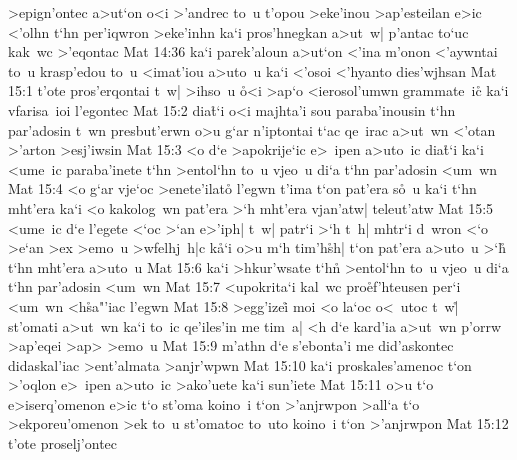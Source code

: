 >epign'ontec
a>ut`on
o<i
>'andrec
to~u
t'opou
>eke'inou
>ap'esteilan
e>ic
<'olhn
t`hn
per'iqwron
>eke'inhn
ka`i
pros'hnegkan
a>ut~w|
p'antac
to`uc
kak~wc
>'eqontac\bibvsend
\vs Mat 14:36
ka`i
parek'aloun
a>ut`on
<'ina
m'onon
<'aywntai
to~u
krasp'edou
to~u
<imat'iou
a>uto~u
ka`i
<'osoi
<'hyanto
dies'wjhsan\bibvsend
\vs Mat 15:1
t'ote
pros'erqontai
t~w|
>ihso~u
\r{o}<i
>ap`o
<ierosol'umwn
grammate~ic\r{}
ka`i
vfarisa~ioi
l'egontec\bibvsend
\vs Mat 15:2
dia\r{t}`i
o<i
majhta'i
sou
paraba'inousin
t`hn
par'adosin
t~wn
presbut'erwn
o>u
g`ar
n'iptontai
t`ac
qe~irac
a>ut~wn
<'otan
>'arton
>esj'iwsin\bibvsend
\vs Mat 15:3
<o
d`e
>apokrije`ic
e>~ipen
a>uto~ic
dia\r{t}`i
ka`i
<ume~ic
paraba'inete
t`hn
>entol`hn
to~u
vjeo~u
di`a
t`hn
par'adosin
<um~wn\bibvsend
\vs Mat 15:4
<o
g`ar
vje`oc
>enete'ilato\r{}
l'egwn
t'ima
t`on
pat'era
s\r{o}~u
ka`i
t`hn
mht'era
ka`i
<o
kakolog~wn
pat'era
>`h
mht'era
vjan'atw|
teleut'atw\bibvsend
\vs Mat 15:5
<ume~ic
d`e
l'egete
<`oc
>`an
e>'iph|
t~w|
patr`i
>`h
t~h|
mhtr`i
d~wron
<`o
>e`an
>ex
>emo~u
>wfelhj~h|c
k\r{a}`i
o>u
m`h
tim'h\r{s}h|
t`on
pat'era
a>uto~u
>`h\r{}
t`hn
mht'era
a>uto~u\bibvsend
\vs Mat 15:6
ka`i
>hkur'wsate
t`hn\r{}
>entol`hn
to~u
vjeo~u
di`a
t`hn
par'adosin
<um~wn\bibvsend
\vs Mat 15:7
<upokrita`i
kal~wc
pro\r{e}f'hteusen
per`i
<um~wn
<h\r{s}a"'iac
l'egwn\bibvsend
\vs Mat 15:8
>egg'izei\r{}
moi
<o
la`oc
o<~utoc
t~w|\r{}
st'omati
a>ut~wn
ka`i
to~ic
qe'iles'in
me
tim~a|
<h
d`e
kard'ia
a>ut~wn
p'orrw
>ap'eqei
>ap>
>emo~u\bibvsend
\vs Mat 15:9
m'athn
d`e
s'ebonta'i
me
did'askontec
didaskal'iac
>ent'almata
>anjr'wpwn\bibvsend
\vs Mat 15:10
ka`i
proskales'amenoc
t`on
>'oqlon
e>~ipen
a>uto~ic
>ako'uete
ka`i
sun'iete\bibvsend
\vs Mat 15:11
o>u
t`o
e>iserq'omenon
e>ic
t`o
st'oma
koino~i
t`on
>'anjrwpon
>all`a
t`o
>ekporeu'omenon
>ek
to~u
st'omatoc
to~uto
koino~i
t`on
>'anjrwpon\bibvsend
\vs Mat 15:12
t'ote
proselj'ontec
